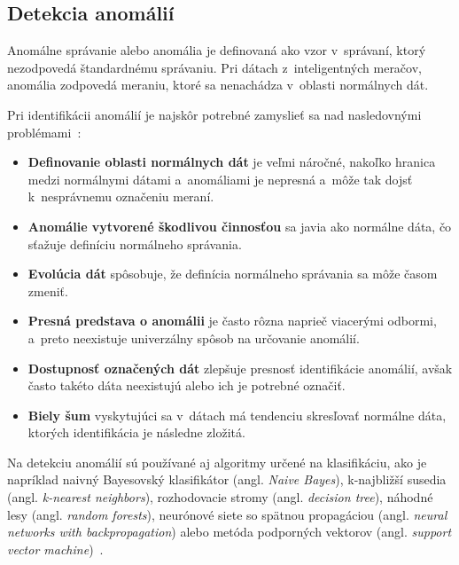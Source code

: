 \documentclass[a4paper,twoside,slovak,12pt,appendix]{article}
\begin{document}

\subsection{Detekcia anomálií}
Anomálne správanie alebo anomália je definovaná ako vzor v~správaní, ktorý
nezodpovedá štandardnému správaniu. Pri dátach z~inteligentných meračov,
anomália zodpovedá meraniu, ktoré sa nenachádza v~oblasti normálnych dát.

Pri identifikácii anomálií je najskôr potrebné zamyslieť sa nad nasledovnými
problémami~\cite{Chandola2009}:
\begin{itemize}
	\item \textbf{Definovanie oblasti normálnych dát} je veľmi náročné, nakoľko
	hranica medzi normálnymi dátami a~anomáliami je nepresná a~môže tak dojsť
	k~nesprávnemu označeniu meraní.

	\item \textbf{Anomálie vytvorené škodlivou činnosťou} sa javia ako normálne
	dáta, čo sťažuje definíciu normálneho správania.

	\item \textbf{Evolúcia dát} spôsobuje, že definícia normálneho správania sa
	môže časom zmeniť.

	\item \textbf{Presná predstava o anomálii} je často rôzna naprieč viacerými
	odbormi, a~preto neexistuje univerzálny spôsob na určovanie anomálií.

	\item \textbf{Dostupnosť označených dát} zlepšuje presnosť identifikácie
	anomálií, avšak často takéto dáta neexistujú alebo ich je potrebné označiť.

	\item \textbf{Biely šum} vyskytujúci sa v~dátach má tendenciu skresľovať
	normálne dáta, ktorých identifikácia je následne zložitá.
\end{itemize}

Na detekciu anomálií sú používané aj algoritmy určené na klasifikáciu, ako je
napríklad naivný Bayesovský klasifikátor (angl. \textit{Naive Bayes}),
k-najbližší susedia (angl. \textit{k-nearest neighbors}), rozhodovacie stromy
(angl. \textit{decision tree}), náhodné lesy (angl. \textit{random forests}),
neurónové siete so spätnou propagáciou (angl. \textit{neural networks with
backpropagation}) alebo metóda podporných vektorov (angl. \textit{support vector
machine})~\cite{Coma-Puig2016}.
\end{document}
